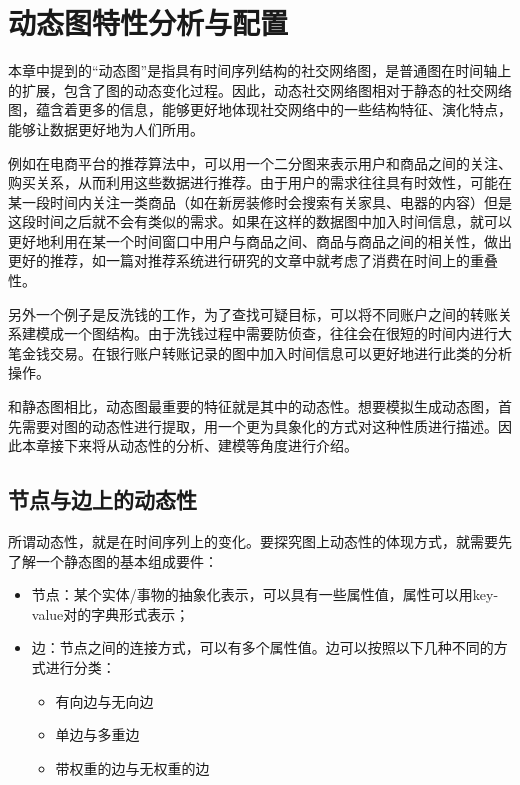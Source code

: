 
\chapter{动态图特性分析与配置}
\label{cha:chapter02}

本章中提到的“动态图”是指具有时间序列结构的社交网络图，是普通图在时间轴上的扩展，包含了图的动态变化过程。因此，动态社交网络图相对于静态的社交网络图，蕴含着更多的信息，能够更好地体现社交网络中的一些结构特征、演化特点，能够让数据更好地为人们所用。

例如在电商平台的推荐算法中，可以用一个二分图来表示用户和商品之间的关注、购买关系，从而利用这些数据进行推荐\cite{7009419}。由于用户的需求往往具有时效性，可能在某一段时间内关注一类商品（如在新房装修时会搜索有关家具、电器的内容）但是这段时间之后就不会有类似的需求。如果在这样的数据图中加入时间信息，就可以更好地利用在某一个时间窗口中用户与商品之间、商品与商品之间的相关性，做出更好的推荐，如一篇对推荐系统进行研究的文章\cite{NAJAFABADI2019526}中就考虑了消费在时间上的重叠性。

另外一个例子是反洗钱的工作，为了查找可疑目标，可以将不同账户之间的转账关系建模成一个图结构。由于洗钱过程中需要防侦查，往往会在很短的时间内进行大笔金钱交易。在银行账户转账记录的图中加入时间信息可以更好地进行此类的分析操作\cite{pareja2019evolvegcn}。

和静态图相比，动态图最重要的特征就是其中的动态性。想要模拟生成动态图，首先需要对图的动态性进行提取，用一个更为具象化的方式对这种性质进行描述。因此本章接下来将从动态性的分析、建模等角度进行介绍。

\section{节点与边上的动态性}
\label{cha:node_edge_dynamic}

所谓动态性，就是在时间序列上的变化。要探究图上动态性的体现方式，就需要先了解一个静态图的基本组成要件：

\begin{itemize}
    \item 节点：某个实体/事物的抽象化表示，可以具有一些属性值，属性可以用key-value对的字典形式表示；
    \item 边：节点之间的连接方式，可以有多个属性值。边可以按照以下几种不同的方式进行分类：
    \begin{itemize}
        \item 有向边与无向边
        \item 单边与多重边
        \item 带权重的边与无权重的边
    \end{itemize}
\end{itemize}

